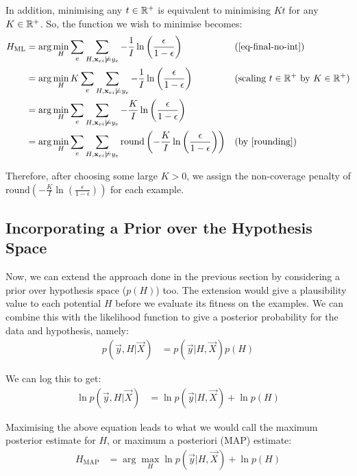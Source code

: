 In addition, minimising any $t \in \mathbb{R}^+$ is equivalent to minimising $K t$ for any $K \in \mathbb{R}^+$.
So, the function we wish to minimise becomes: 
\begin{align}
H_{\text{ML}}
& = \arg\min_{H}
\sum_e  
\sum_{H,\textbf{x}_{ei}\not\models y_e} -\frac{1}{I}\ln \left ( \frac{\epsilon}{1 - \epsilon} \right ) 
&& \text{(\ref{eq-final-no-int})} \nonumber \\
& = \arg\min_{H}
K \sum_e  
\sum_{H,\textbf{x}_{ei}\not\models y_e} -\frac{1}{I}\ln \left ( \frac{\epsilon}{1 - \epsilon} \right ) 
&& \text{(scaling $t \in \mathbb{R}^+$ by $K \in \mathbb{R}^+$)} \nonumber \\
& = \arg\min_{H}
\sum_e  
\sum_{H,\textbf{x}_{ei}\not\models y_e} -\frac{K}{I}\ln \left ( \frac{\epsilon}{1 - \epsilon} \right ) \nonumber \\ 
& = \arg\min_{H}
\sum_e  
\sum_{H,\textbf{x}_{ei}\not\models y_e} \text{round} \left ( -\frac{K}{I}\ln \left ( \frac{\epsilon}{1 - \epsilon} \right ) \right )
&& \text{(by \ref{rounding})}
\end{align}

Therefore, after choosing some large $K > 0$, we assign the non-coverage penalty of $\text{round} \left ( -\frac{K}{I} \ln \left ( \frac{\epsilon}{1 - \epsilon} \right ) \right )$ for each example.

\subsection{Incorporating a Prior over the Hypothesis Space}

Now, we can extend the approach done in the previous section by considering a prior over hypothesis space ($p(H)$) too.
The extension would give a plausibility value to each potential $H$ before we evaluate its fitness on the examples. 
We can combine this with the likelihood function to give a posterior probability for the data and hypothesis, namely:
\begin{align}
p(\vec{y}, H|\vec{X})
& = p(\vec{y}|H, \vec{X})p(H)
\end{align}

We can log this to get:
\begin{align}
\ln p(\vec{y}, H|\vec{X})
& = \ln p(\vec{y}|H, \vec{X}) + \ln p(H)
\end{align}

Maximising the above equation leads to what we would call the maximum posterior estimate for $H$, or maximum a posteriori (MAP) estimate:
\begin{align}
H_{\text{MAP}}
& = \arg\max_{H} \ln p(\vec{y}|H, \vec{X}) + \ln p(H) 
\end{align}

